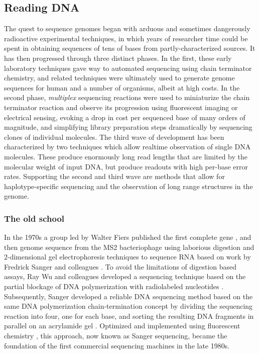 \subsection{Reading DNA}

The quest to sequence genomes began with arduous and sometimes dangerously radioactive experimental techniques, in which years of researcher time could be spent in obtaining sequences of tens of bases from partly-characterized sources.
It has then progressed through three distinct phases.
In the first, these early laboratory techniques gave way to automated sequencing using chain terminator chemistry, and related techniques were ultimately used to generate genome sequences for human and a number of organisms, albeit at high costs.
In the second phase, \emph{multiplex} sequencing reactions were used to miniaturize the chain terminator reaction and observe its progression using fluorescent imaging or electrical sensing, evoking a drop in cost per sequenced base of many orders of magnitude, and simplifying library preparation steps dramatically by sequencing clones of individual molecules.
The third wave of development has been characterized by two techniques which allow realtime observation of single DNA molecules.
These produce enormously long read lengths that are limited by the molecular weight of input DNA, but produce readouts with high per-base error rates.
Supporting the second and third wave are methods that allow for haplotype-specific sequencing and the observation of long range structures in the genome.

\subsubsection{The old school}

In the 1970s a group led by Walter Fiers published the first complete gene \cite{jou1972nucleotide}, and then genome sequence \cite{fiers1976complete} from the MS2 bacteriophage using laborious digestion and 2-dimensional gel electrophoresis techniques to sequence RNA based on work by Fredrick Sanger and colleagues \cite{sanger1965two, adams1969nucleotide}.
To avoid the limitations of digestion based assays, Ray Wu and colleagues developed a sequencing technique based on the partial blockage of DNA polymerization with radiolabeled nucleotides \cite{wu1972nucleotide, padmanabhan1974chemical}.
Subsequently, Sanger developed a reliable DNA sequencing method based on the same DNA polymerization chain-termination concept by dividing the sequencing reaction into four, one for each base, and sorting the resulting DNA fragments in parallel on an acrylamide gel \cite{sanger1977dna}.
Optimized and implemented using fluorescent chemistry \cite{strauss1986specific}, this approach, now known as Sanger sequencing, became the foundation of the first commercial sequencing machines in the late 1980s.


